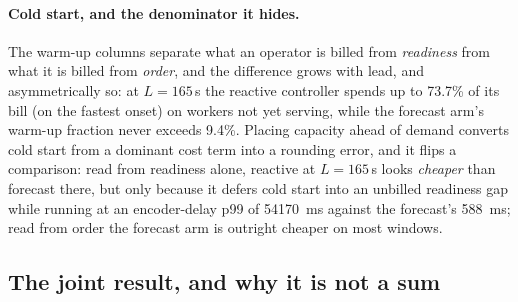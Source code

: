 \paragraph{Cold start, and the denominator it hides.} The warm-up columns
separate what an operator is billed from \emph{readiness} from what it is
billed from \emph{order}, and the difference grows with lead, and
asymmetrically so: at $L{=}165$\,\si{\second} the reactive controller spends up to
73.7\% of its bill (on the fastest onset) on workers not yet serving, while the
forecast arm's warm-up fraction never exceeds 9.4\%. Placing capacity ahead of demand
converts cold start from a dominant cost term into a rounding error, and it
flips a comparison: read from readiness alone, reactive at
$L{=}165$\,\si{\second} looks \emph{cheaper} than forecast there, but only
because it defers cold start into an unbilled readiness gap while running at an
encoder-delay p99 of \SI{54170}{\milli\second} against the forecast's
\SI{588}{\milli\second}; read from order the forecast arm is outright cheaper
on most windows.

\subsection{The joint result, and why it is not a sum}
\label{sec:cl-ledger-joint}

